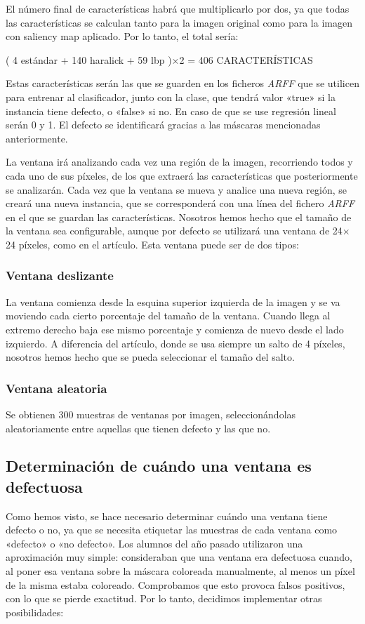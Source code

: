 El número final de características habrá que multiplicarlo por dos, ya que todas las características se calculan tanto para la imagen original como para la imagen con saliency map aplicado. Por lo tanto, el total sería:

( 4 estándar + 140 haralick + 59 lbp )$\times$2 = 406 CARACTERÍSTICAS

Estas características serán las que se guarden en los ficheros \textit{ARFF} que se utilicen para entrenar
al clasificador, junto con la clase, que tendrá valor «true» si la instancia tiene defecto, o «false» si
no. En caso de que se use regresión lineal serán 0 y 1. El defecto se identificará gracias a las máscaras mencionadas anteriormente.

La ventana irá analizando cada vez una región de la imagen, recorriendo todos y cada uno de sus píxeles, de los que extraerá las características que posteriormente se analizarán. Cada vez que la ventana se mueva y analice una nueva región, se creará una nueva instancia, que se corresponderá con una línea del fichero \textit{ARFF} en el que se guardan las características. Nosotros hemos hecho que el tamaño de la ventana sea configurable, aunque por defecto se utilizará una ventana de 24$\times$24 píxeles, como en el artículo. Esta ventana puede ser de dos tipos:

\subsubsection*{Ventana deslizante}
La ventana comienza desde la esquina superior izquierda de la imagen y se va moviendo cada cierto porcentaje del tamaño de la ventana. Cuando llega al extremo derecho baja ese mismo porcentaje y comienza de nuevo desde el lado izquierdo. A diferencia del artículo, donde se usa siempre un salto de 4 píxeles, nosotros hemos hecho que se pueda seleccionar el tamaño del salto.


\subsubsection*{Ventana aleatoria}
Se obtienen 300 muestras de ventanas por imagen, seleccionándolas aleatoriamente entre aquellas que tienen defecto y las que no.

\subsection{Determinación de cuándo una ventana es defectuosa}
Como hemos visto, se hace necesario determinar cuándo una ventana tiene defecto o no, ya que se necesita etiquetar las muestras de cada ventana como «defecto» o «no defecto». Los alumnos del año pasado utilizaron una aproximación muy simple: consideraban que una ventana era defectuosa cuando, al poner esa ventana sobre la máscara coloreada manualmente, al menos un píxel de la misma estaba coloreado. Comprobamos que esto provoca falsos positivos, con lo que se pierde exactitud. Por lo tanto, decidimos implementar otras posibilidades:

